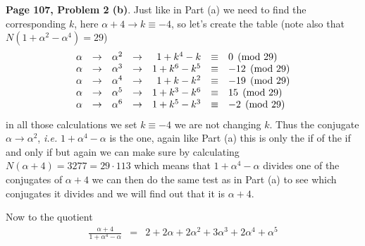 \documentclass[aps,preprint,preprintnumbers,nofootinbib,showpacs,prd]{revtex4-1}
\newcommand{\ie}{{\it i.e.} }
\newcommand{\nbea}{\begin{eqnarray*}}
\newcommand{\neea}{\end{eqnarray*}}
\begin{document}
{\bf Page 107, Problem 2 (b)}. Just like in Part (a) we need to find the corresponding $k$, here $\alpha + 4 \to k \equiv -4$, so let's create the table (note also that $N(1 + \alpha^2 - \alpha^4) = 29$)
%
\nbea
\begin{array}{r c l c r c l}
\alpha & \to & \alpha^2 & \to & 1 + k^4 - k & \equiv & 0 \pmod{29} \\
\alpha & \to & \alpha^3 & \to & 1 + k^6 - k^5 & \equiv & -12 \pmod{29} \\
\alpha & \to & \alpha^4 & \to & 1 + k - k^2 & \equiv & -19 \pmod{29} \\
\alpha & \to & \alpha^5 & \to & 1 + k^3 - k^6 & \equiv & 15 \pmod{29} \\
\alpha & \to & \alpha^6 & \to & 1 + k^5 - k^3 & \equiv & -2 \pmod{29} 
\end{array}
\neea
%
in all those calculations we set $k \equiv -4$ we are not changing $k$. Thus the conjugate $\alpha \to \alpha^2$, \ie $1 + \alpha^4 - \alpha$ is the one, again like Part (a) this is only the if of the if and only if but again we can make sure by calculating $N(\alpha + 4) = 3277 = 29 \cdot 113$ which means that $1 + \alpha^4 - \alpha$ divides one of the conjugates of $\alpha + 4$ we can then do the same test as in Part (a) to see which conjugates it divides and we will find out that it is $\alpha + 4$.

Now to the quotient
%
\nbea
\frac{\alpha + 4}{1 + \alpha^4 - \alpha} & = & 2 + 2\alpha + 2\alpha^2 + 3\alpha^3 + 2\alpha^4 + \alpha^5
\neea
%
\end{document}
